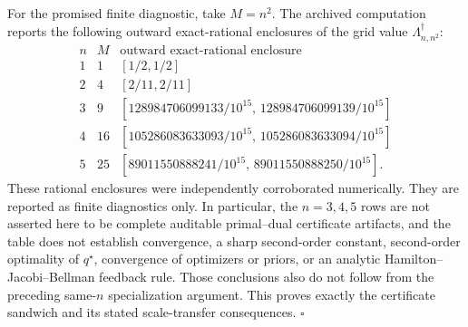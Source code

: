 For the promised finite diagnostic, take \(M=n^2\).  The archived computation reports the following outward exact-rational enclosures of the grid value \(\Lambda_{n,n^2}^\dagger\):
\[
\begin{array}{c|c|c}
n&M&\text{outward exact-rational enclosure}\\ \hline
1&1&[1/2,1/2]\\
2&4&[2/11,2/11]\\
3&9&[128984706099133/10^{15},\,128984706099139/10^{15}]\\
4&16&[105286083633093/10^{15},\,105286083633094/10^{15}]\\
5&25&[89011550888241/10^{15},\,89011550888250/10^{15}].
\end{array}
\]
These rational enclosures were independently corroborated numerically.  They are reported as finite diagnostics only.  In particular, the \(n=3,4,5\) rows are not asserted here to be complete auditable primal--dual certificate artifacts, and the table does not establish convergence, a sharp second-order constant, second-order optimality of \(q^\star\), convergence of optimizers or priors, or an analytic Hamilton--Jacobi--Bellman feedback rule.  Those conclusions also do not follow from the preceding same-\(n\) specialization argument.  This proves exactly the certificate sandwich and its stated scale-transfer consequences. \(\square\)